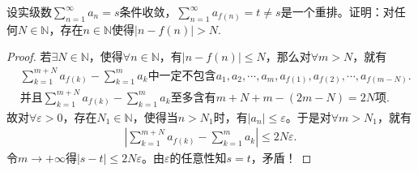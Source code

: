 \documentclass[../../main.tex]{subfiles}
\begin{document}
\begin{example}
设实级数$\sum_{n=1}^{\infty} a_n = s$条件收敛，$\sum_{n=1}^{\infty} a_{f(n)} = t \neq s$是一个重排。证明：对任何$N \in \mathbb{N}$，存在$n \in \mathbb{N}$使得$|n - f(n)| > N$.
\end{example}
\begin{proof}
若$\exists N\in \mathbb{N}$，使得$\forall n\in \mathbb{N}$，有$\left| n-f\left( n \right) \right|\leqslant N$，那么对$\forall m>N$，就有
\begin{align*}
&\sum_{k=1}^{m+N}{a_{f\left( k \right)}}-\sum_{k=1}^m{a_k}\text{中一定不包含}a_1,a_2,\cdots ,a_m,a_{f\left( 1 \right)},a_{f\left( 2 \right)},\cdots ,a_{f\left( m-N \right)}.
\\
&\text{并且}\sum_{k=1}^{m+N}{a_{f\left( k \right)}}-\sum_{k=1}^m{a_k}\text{至多含有}m+N+m-\left( 2m-N \right) =2N\text{项}.
\end{align*}
故对$\forall \varepsilon >0$，存在$N_1\in \mathbb{N}$，使得当$n>N_1$时，有$\left| a_n \right|\leqslant \varepsilon$。于是对$\forall m>N_1$，就有
\begin{align*}
\left| \sum_{k=1}^{m+N}{a_{f\left( k \right)}}-\sum_{k=1}^m{a_k} \right|\leqslant 2N\varepsilon.
\end{align*}
令$m\rightarrow +\infty$得$\left| s-t \right|\leqslant 2N\varepsilon$。由$\varepsilon$的任意性知$s=t$，矛盾！
\end{proof}
\end{document}

